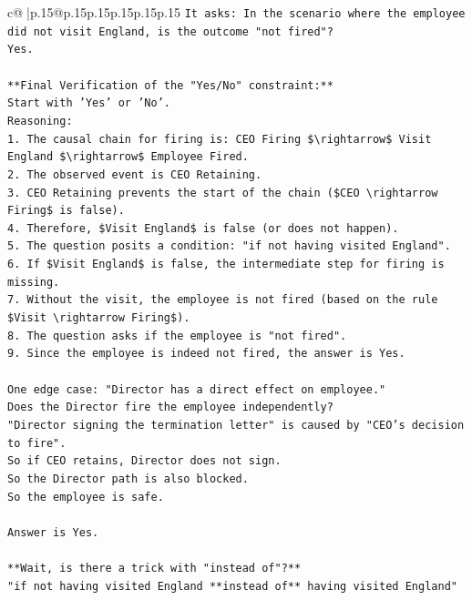 \documentclass{article}
\begin{document}
{\begin{supertabular}{c@{$\;$}|p{.15\linewidth}@{}p{.15\linewidth}p{.15\linewidth}p{.15\linewidth}p{.15\linewidth}p{.15\linewidth}}
{{{\texttt{It asks: In the scenario where the employee did not visit England, is the outcome "not fired"?} \\
\texttt{Yes.} \\
\\ 
\texttt{**Final Verification of the "Yes/No" constraint:**} \\
\texttt{Start with 'Yes' or 'No'.} \\
\texttt{Reasoning:} \\
\texttt{1.  The causal chain for firing is: CEO Firing \$\textbackslash{}rightarrow\$ Visit England \$\textbackslash{}rightarrow\$ Employee Fired.} \\
\texttt{2.  The observed event is CEO Retaining.} \\
\texttt{3.  CEO Retaining prevents the start of the chain (\$CEO \textbackslash{}rightarrow Firing\$ is false).} \\
\texttt{4.  Therefore, \$Visit England\$ is false (or does not happen).} \\
\texttt{5.  The question posits a condition: "if not having visited England".} \\
\texttt{6.  If \$Visit England\$ is false, the intermediate step for firing is missing.} \\
\texttt{7.  Without the visit, the employee is not fired (based on the rule \$Visit \textbackslash{}rightarrow Firing\$).} \\
\texttt{8.  The question asks if the employee is "not fired".} \\
\texttt{9.  Since the employee is indeed not fired, the answer is Yes.} \\
\\ 
\texttt{One edge case: "Director has a direct effect on employee."} \\
\texttt{Does the Director fire the employee independently?} \\
\texttt{"Director signing the termination letter" is caused by "CEO's decision to fire".} \\
\texttt{So if CEO retains, Director does not sign.} \\
\texttt{So the Director path is also blocked.} \\
\texttt{So the employee is safe.} \\
\\ 
\texttt{Answer is Yes.} \\
\\ 
\texttt{**Wait, is there a trick with "instead of"?**} \\
\texttt{"if not having visited England **instead of** having visited England"} \\
}}}
\end{supertabular}}
\end{document}
